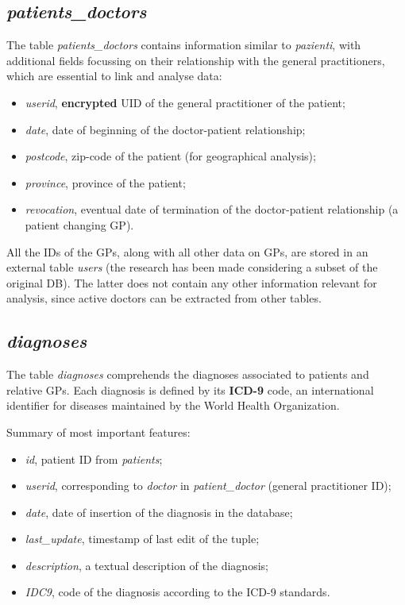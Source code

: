 \subsection{\textit{patients\_doctors}}
The table \textit{patients\_doctors} contains information similar to \textit{pazienti}, with additional fields focussing on their relationship with the general practitioners, which are essential to link and analyse data:
\begin{itemize}
	\item \textit{userid}, \textbf{encrypted} UID of the general practitioner of the patient;
	\item \textit{date}, date of beginning of the doctor-patient relationship;
	\item \textit{postcode}, zip-code of the patient (for geographical analysis);
	\item \textit{province}, province of the patient;
	\item \textit{revocation}, eventual date of termination of the doctor-patient relationship (a patient changing GP).
\end{itemize}

All the IDs of the GPs, along with all other data on GPs, are stored in an external table \textit{users} (the research has been made considering a subset of the original DB). The latter does not contain any other information relevant for analysis, since active doctors can be extracted from other tables.

\subsection{\textit{diagnoses}}
The table \textit{diagnoses} comprehends the diagnoses associated to patients and relative GPs. Each diagnosis is defined by its \textbf{ICD-9} code, an international identifier for diseases maintained by the World Health Organization. 

Summary of most important features:
\begin{itemize}
	\item \textit{id}, patient ID from \textit{patients};
	\item \textit{userid}, corresponding to \textit{doctor} in \textit{patient\_doctor} (general practitioner ID);
	\item \textit{date}, date of insertion of the diagnosis in the database;
	\item \textit{last\_update}, timestamp of last edit of the tuple;
	\item \textit{description}, a textual description of the diagnosis;
	\item \textit{IDC9}, code of the diagnosis according to the ICD-9 standards.
\end{itemize}

